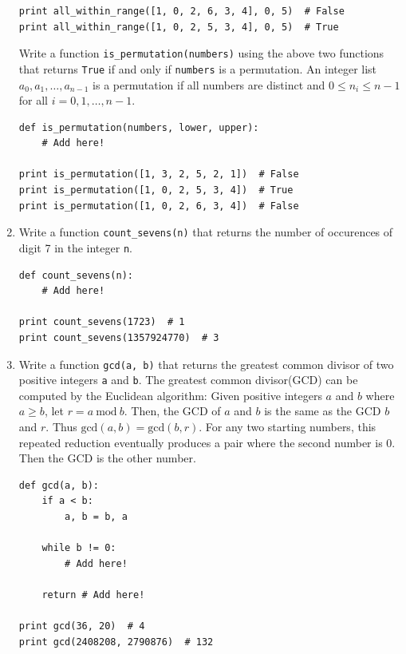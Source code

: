 \documentclass[../main.tex]{subfiles}
\begin{document}
\begin{enumerate}
\begin{verbatim}
print all_within_range([1, 0, 2, 6, 3, 4], 0, 5)  # False
print all_within_range([1, 0, 2, 5, 3, 4], 0, 5)  # True
\end{verbatim}
Write a function \texttt{is\_permutation(numbers)} using the above two functions that returns \texttt{True} if and only if \texttt{numbers} is a permutation.
An integer list $a_0, a_1, \dots, a_{n - 1}$ is a permutation if all numbers are distinct and $0 \leq n_i \leq n - 1$ for all $i = 0, 1, \dots, n - 1$.
\begin{verbatim}
def is_permutation(numbers, lower, upper):
	# Add here!

print is_permutation([1, 3, 2, 5, 2, 1])  # False
print is_permutation([1, 0, 2, 5, 3, 4])  # True
print is_permutation([1, 0, 2, 6, 3, 4])  # False
\end{verbatim}

\item Write a function \texttt{count\_sevens(n)} that returns the number of occurences of digit 7 in the integer \texttt{n}.
\begin{verbatim}
def count_sevens(n):
	# Add here!

print count_sevens(1723)  # 1
print count_sevens(1357924770)  # 3
\end{verbatim}

\item Write a function \texttt{gcd(a, b)} that returns the greatest common divisor of two positive integers \texttt{a} and \texttt{b}.
The greatest common divisor(GCD) can be computed by the Euclidean algorithm:
Given positive integers $a$ and $b$ where $a \geq b$, let $r = a\ \mathrm{mod}\ b$.
Then, the GCD of $a$ and $b$ is the same as the GCD $b$ and $r$.
Thus $\mathrm{gcd}(a, b) = \mathrm{gcd}(b, r)$.
For any two starting numbers, this repeated reduction eventually produces a pair where the second number is 0.
Then the GCD is the other number.
\begin{verbatim}
def gcd(a, b):
	if a < b:
		a, b = b, a
	
	while b != 0:
		# Add here!
	
	return # Add here!

print gcd(36, 20)  # 4
print gcd(2408208, 2790876)  # 132
\end{verbatim}
\end{enumerate}
\end{document}
